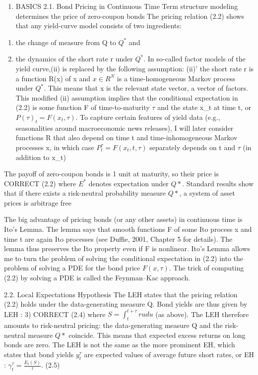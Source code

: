 \documentclass[
]{article}
\providecommand{\tightlist}{%
  \setlength{\itemsep}{0pt}\setlength{\parskip}{0pt}}
\begin{document}
\begin{enumerate}
\def\labelenumi{\arabic{enumi}.}
\setcounter{enumi}{1}
\tightlist
\item
  BASICS
  2.1. Bond Pricing in Continuous Time
  Term structure modeling determines the price of zero-coupon bonds
  The pricing relation (2.2) shows that any yield-curve model consists of two ingredients:
\end{enumerate}

\begin{enumerate}
\def\labelenumi{(\roman{enumi})}
\tightlist
\item
  the change of measure from Q to \(Q^{\ast}\) and
\item
  the dynamics of the short rate r under \(Q^{\ast}\).
  In so-called factor models of the yield curve,(ii) is replaced by the following assumption:
  (ii)' the short rate r is a function R(x) of x and \(x \in R^N\) is a time-homogeneous Markov process under \(Q^{\ast}\).
  This means that x is the relevant state vector, a vector of factors. This modified (ii)
  assumption implies that the conditional expectation in (2.2) is some function F of time-to-maturity \(\tau\) and the state x\_t at time t, or
  \(P(\tau)_t = F(x_t, \tau)\).
  To capture certain features of yield data (e.g., seasonalities around macroeconomic
  news releases), I will later consider functions R that also depend on time t and time-inhomogeneous Markov processes x, in which case \(P^{\tau}_t = F(x_t, t,\tau)\) separately depends on t and \(\tau\) (in addition to x\_t)
\end{enumerate}

The payoff of zero-coupon bonds is 1 unit at maturity, so their price is
CORRECT (2.2)
where \(E^{\ast}\) denotes expectation under \(Q{\ast}\). Standard results show that if there exists a risk-neutral probability measure \(Q{\ast}\), a system of asset prices is arbitrage free

The big advantage of pricing bonds (or any other assets) in continuous time is Ito's
Lemma. The lemma says that smooth functions F of some Ito process x and time t are
again Ito processes (see Duffie, 2001, Chapter 5 for details). The lemma thus preserves
the Ito property even if F is nonlinear. Ito's Lemma allows me to turn the problem
of solving the conditional expectation in (2.2) into the problem of solving a PDE for
the bond price \(F(x, \tau)\). The trick of computing (2.2) by solving a PDE is called the
Feynman--Kac approach.

2.2. Local Expectations Hypothesis
The LEH states that the pricing relation (2.2) holds under the data-generating measure
Q. Bond yields are thus given by
LEH : 3) CORRECT (2.4)
where \(S = \int_{t}^{t+\tau} ru du\) (as above). The LEH therefore amounts to risk-neutral pricing: the data-generating measure Q and the risk-neutral measure \(Q{\ast}\) coincide. This means that
expected excess returns on long bonds are zero.
The LEH is not the same as the more prominent EH, which states that bond yields
\(y^{\tau}_t\) are expected values of average future short rates, or
EH : \(\gamma^{\tau}_t = \frac{E_t(S)}{\tau}\). (2.5)
\end{document}
